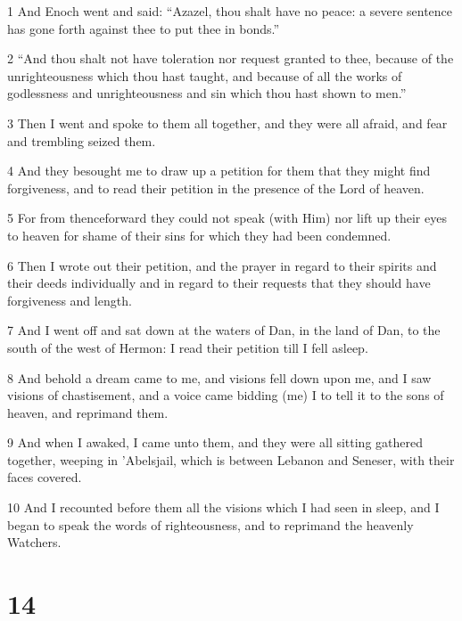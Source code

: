 \par 1 And Enoch went and said: “Azazel, thou shalt have no peace: a severe sentence has gone forth against thee to put thee in bonds.”
\par 2 “And thou shalt not have toleration nor request granted to thee, because of the unrighteousness which thou hast taught, and because of all the works of godlessness and unrighteousness and sin which thou hast shown to men.”
\par 3 Then I went and spoke to them all together, and they were all afraid, and fear and trembling seized them.
\par 4 And they besought me to draw up a petition for them that they might find forgiveness, and to read their petition in the presence of the Lord of heaven.
\par 5 For from thenceforward they could not speak (with Him) nor lift up their eyes to heaven for shame of their sins for which they had been condemned.
\par 6 Then I wrote out their petition, and the prayer in regard to their spirits and their deeds individually and in regard to their requests that they should have forgiveness and length.
\par 7 And I went off and sat down at the waters of Dan, in the land of Dan, to the south of the west of Hermon: I read their petition till I fell asleep.
\par 8 And behold a dream came to me, and visions fell down upon me, and I saw visions of chastisement, and a voice came bidding (me) I to tell it to the sons of heaven, and reprimand them.
\par 9 And when I awaked, I came unto them, and they were all sitting gathered together, weeping in ’Abelsjail, which is between Lebanon and Seneser, with their faces covered.
\par 10 And I recounted before them all the visions which I had seen in sleep, and I began to speak the words of righteousness, and to reprimand the heavenly Watchers.

\chapter{14}

